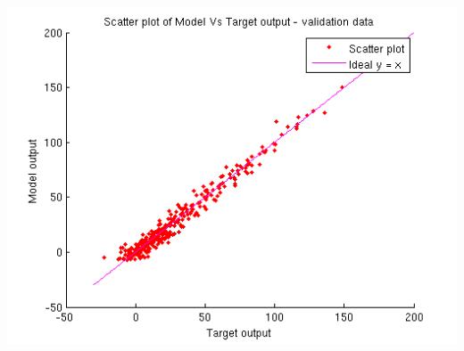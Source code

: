 \documentclass{article}
\begin{document}
\begin{center}
\includegraphics[scale=.6]{Regression/bivar/nu/scatter_val}
\end{center}
\end{document}
